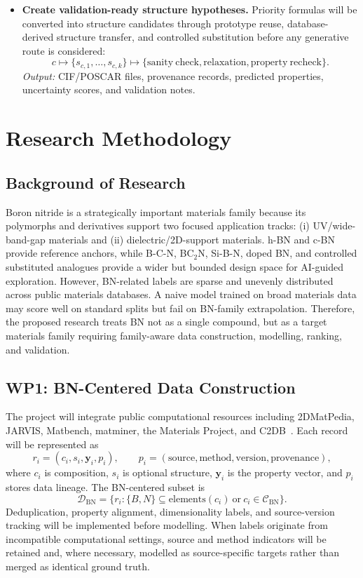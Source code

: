 \documentclass[10pt,a4paper]{article}
\begin{document}
\begin{itemize}[leftmargin=*]
  \item \textbf{Create validation-ready structure hypotheses.} Priority formulas will be converted into structure candidates through prototype reuse, database-derived structure transfer, and controlled substitution before any generative route is considered:
  \[
    c\mapsto\{s_{c,1},\ldots,s_{c,k}\}\mapsto
    \{\mathrm{sanity\ check},\mathrm{relaxation},\mathrm{property\ recheck}\}.
  \]
  \textit{Output:} CIF/POSCAR files, provenance records, predicted properties, uncertainty scores, and validation notes.
\end{itemize}

\section{Research Methodology}
\subsection{Background of Research}
Boron nitride is a strategically important materials family because its polymorphs and derivatives support two focused application tracks: (i) UV/wide-band-gap materials and (ii) dielectric/2D-support materials. h-BN and c-BN provide reference anchors, while B-C-N, BC$_2$N, Si-B-N, doped BN, and controlled substituted analogues provide a wider but bounded design space for AI-guided exploration. However, BN-related labels are sparse and unevenly distributed across public materials databases. A naive model trained on broad materials data may score well on standard splits but fail on BN-family extrapolation. Therefore, the proposed research treats BN not as a single compound, but as a target materials family requiring family-aware data construction, modelling, ranking, and validation.

\subsection{WP1: BN-Centered Data Construction}
The project will integrate public computational resources including 2DMatPedia, JARVIS, Matbench, matminer, the Materials Project, and C2DB~\cite{zhou2019_2dmatpedia,choudhary2020_jarvis,dunn2020_matbench,ward2018_matminer,jain2013_mp,haastrup2018_c2db}. Each record will be represented as
\[
  r_i=(c_i,s_i,\mathbf{y}_i,p_i),\qquad
  p_i=(\mathrm{source},\mathrm{method},\mathrm{version},\mathrm{provenance}),
\]
where $c_i$ is composition, $s_i$ is optional structure, $\mathbf{y}_i$ is the property vector, and $p_i$ stores data lineage. The BN-centered subset is
\[
  \mathcal{D}_{\mathrm{BN}}=\{r_i:\{B,N\}\subseteq\mathrm{elements}(c_i)\ \mathrm{or}\ c_i\in\mathcal{C}_{\mathrm{BN}}\}.
\]
Deduplication, property alignment, dimensionality labels, and source-version tracking will be implemented before modelling. When labels originate from incompatible computational settings, source and method indicators will be retained and, where necessary, modelled as source-specific targets rather than merged as identical ground truth.
\end{document}
